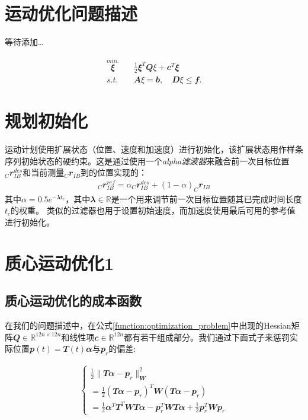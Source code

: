 \section{运动优化问题描述\label{section:motion_plan}}
等待添加\dots

\begin{align}
    \label{function:optimization_problem}
    \overset{min.}{\mathbfit \xi} \quad & \frac{1}{2}{\mathbfit \xi}^T {\mathbfit Q \xi} + {\mathbfit c}^T{\mathbfit \xi} \\
    s.t. \quad & {\mathbfit A\xi} = {\mathbfit  b}, \quad {\mathbfit D\xi} \leq {\mathbfit f}. \tag{16}
\end{align}

\section{规划初始化}
运动计划使用扩展状态（位置、速度和加速度）进行初始化，该扩展状态用作样条序列初始状态的硬约束。这是通过使用一个\emph{alpha滤波器}来融合前一次目标位置$_C\mathbfit{r}_{IB}^{des}$和当前测量$_C\mathbfit{r}_{IB}$到的位置实现的：
\begin{align}
    _C\mathbfit{r}_{IB}^{ref}=\alpha _C\mathbfit{r}_{IB}^{des}+(1-\alpha)_C\mathbfit{r}_{IB}
\end{align}
其中$\alpha=0.5e^{-\mathbfit{\lambda} t_c}$，其中$\mathbfit{\lambda}\in \mathbb{R}$是一个用来调节前一次目标位置随其已完成时间长度$t_c$的权重。
类似的过滤器也用于设置初始速度，而加速度使用最后可用的参考值进行初始化。



\section{质心运动优化1}

\subsection{质心运动优化的成本函数\label{subsection:cost_function}}

在我们的问题描述中，在公式\eqref{function:optimization_problem}中出现的Hessian矩阵$\mathbfit{Q}\in\mathbb{R}^{12n\times12n}$和线性项$\mathbfit{c}\in\mathbb{R}^{12n}$都有若干组成部分。我们通过下面式子来惩罚实际位置$\mathbfit{p}(t)=\mathbfit{T}(t)\mathbfit{\alpha}$与$\mathbfit{p}_r$的偏差:

\begin{align}
    \label{function:penalize_deviation}
    \begin{cases}
        \frac{1}{2}\|\mathbfit{T}\mathbfit{\alpha}-\mathbfit{p}_r\|^2_{\mathbfit{W}}\\
        =\frac{1}{2}(\mathbfit{T}\mathbfit{\alpha}-\mathbfit{p}_r)^T \mathbfit{W} (\mathbfit{T}\mathbfit{\alpha}-\mathbfit{p}_r)\\
        =\frac{1}{2}\mathbfit{\alpha}^T\mathbfit{T}^T \mathbfit{W} \mathbfit{T}\mathbfit{\alpha}-\mathbfit{p}_r^T \mathbfit{W} \mathbfit{T}\mathbfit{\alpha}+\frac{1}{2}\mathbfit{p}_r^T \mathbfit{W} \mathbfit{p}_r
    \end{cases}
\end{align}

